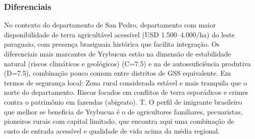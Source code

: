 \subsubsection*{Diferenciais}\label{dif-yrybucua-0219}
No contexto do departamento de San Pedro, departamento com maior disponibilidade de terra agricultável acessível (USD 1.500–4.000/ha) do leste paraguaio, com presença brasiguaia histórica que facilita integração. Os diferenciais mais marcantes de Yrybucua estão na dimensão de estabilidade natural (riscos climáticos e geológicos) (C=7.5) e na de autossuficiência produtiva (D=7.5), combinação pouco comum entre distritos de GSS equivalente. Em termos de segurança local: Zona rural considerada estável e mais tranquila que o norte do departamento. Riscos focados em conflitos de terra esporádicos e crimes contra o patrimônio em fazendas (abigeato). T. O perfil de imigrante brasileiro que melhor se beneficia de Yrybucua é o de agricultores familiares, pecuaristas, pioneiros rurais com capital limitado, que encontra aqui uma combinação de custo de entrada acessível e qualidade de vida acima da média regional.
